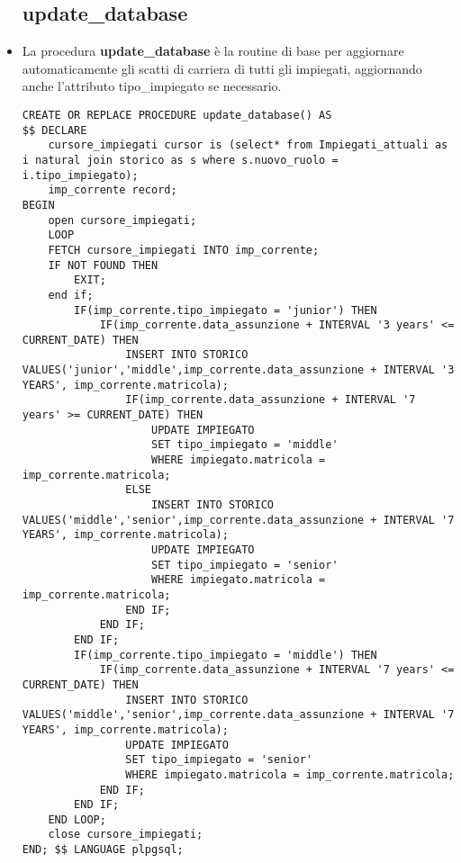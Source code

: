 \begin{itemize}
\subsection{update\_database}
\normalsize
\item La procedura \textbf{update\_database} è la routine di base per aggiornare automaticamente gli scatti di carriera di tutti gli impiegati, aggiornando anche l'attributo tipo\_impiegato se necessario.
\scriptsize
\begin{lstlisting}
CREATE OR REPLACE PROCEDURE update_database() AS
$$ DECLARE
	cursore_impiegati cursor is (select* from Impiegati_attuali as i natural join storico as s where s.nuovo_ruolo = i.tipo_impiegato);
	imp_corrente record;
BEGIN
	open cursore_impiegati;
	LOOP
	FETCH cursore_impiegati INTO imp_corrente;
	IF NOT FOUND THEN
		EXIT;
	end if;
		IF(imp_corrente.tipo_impiegato = 'junior') THEN
			IF(imp_corrente.data_assunzione + INTERVAL '3 years' <= CURRENT_DATE) THEN
				INSERT INTO STORICO VALUES('junior','middle',imp_corrente.data_assunzione + INTERVAL '3 YEARS', imp_corrente.matricola);
				IF(imp_corrente.data_assunzione + INTERVAL '7 years' >= CURRENT_DATE) THEN
					UPDATE IMPIEGATO
					SET tipo_impiegato = 'middle'
					WHERE impiegato.matricola = imp_corrente.matricola;
				ELSE
					INSERT INTO STORICO VALUES('middle','senior',imp_corrente.data_assunzione + INTERVAL '7 YEARS', imp_corrente.matricola);
					UPDATE IMPIEGATO
					SET tipo_impiegato = 'senior'
					WHERE impiegato.matricola = imp_corrente.matricola;
				END IF;
			END IF;
		END IF;
		IF(imp_corrente.tipo_impiegato = 'middle') THEN
			IF(imp_corrente.data_assunzione + INTERVAL '7 years' <= CURRENT_DATE) THEN
				INSERT INTO STORICO VALUES('middle','senior',imp_corrente.data_assunzione + INTERVAL '7 YEARS', imp_corrente.matricola);
				UPDATE IMPIEGATO
				SET tipo_impiegato = 'senior'
				WHERE impiegato.matricola = imp_corrente.matricola;
			END IF;
		END IF;
	END LOOP;
	close cursore_impiegati;
END; $$ LANGUAGE plpgsql;
\end{lstlisting}

\end{itemize}